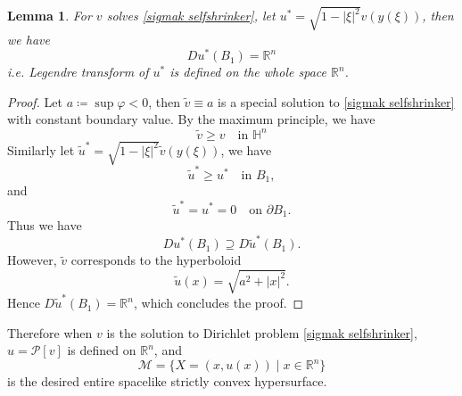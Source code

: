 \documentclass[reqno]{amsart}
\newtheorem{lemma}[theorem]{Lemma}
\theoremstyle{remark}
\theoremstyle{definition}
\numberwithin{equation}{section}
\begin{document}
\begin{lemma}
    For $v$ solves \eqref{sigmak selfshrinker}, let $u^*=\sqrt{1 - |\xi |^2} v(y(\xi))$, then we have
    \[
    Du^*(B_1) = \mathbb{R}^n
    \]
    i.e. Legendre transform of $u^*$ is defined on the whole space $\mathbb{R}^n$.
\end{lemma}
\begin{proof}
    Let $a \coloneqq \sup \varphi < 0$, then $\tilde{v} \equiv a$ is a special solution to \eqref{sigmak selfshrinker} with constant boundary value. By the maximum principle, we have
    \[
    \tilde{v} \geqslant v \quad \text{in } \mathbb{H}^n
    \]
    Similarly let $\tilde{u}^*=\sqrt{1 - |\xi |^2} \tilde{v}(y(\xi))$, we have
    \[
    \tilde{u}^* \geqslant u^* \quad \text{in } B_1,
    \]
    and
    \[
    \tilde{u}^* = u^* = 0 \quad \text{on } \partial B_1.
    \]
    Thus we have
    \[
    Du^*(B_1) \supseteq D\tilde{u}^*(B_1). 
    \]
    However, $\tilde{v}$ corresponds to the hyperboloid
    \[
    \tilde{u}(x) = \sqrt{a^2+|x|^2}.
    \]
    Hence $D\tilde{u}^*(B_1) = \mathbb{R}^n$, which concludes the proof.
\end{proof}
Therefore when $v$ is the solution to Dirichlet problem \eqref{sigmak selfshrinker}, $u = \mathscr{P}[v]$ is defined on $\mathbb{R}^n$, and \[
\mathcal{M} = \{ X = (x,u(x)) \mid x \in \mathbb{R}^n \}
\]
is the desired entire spacelike strictly convex hypersurface.


 
 
\end{document}

